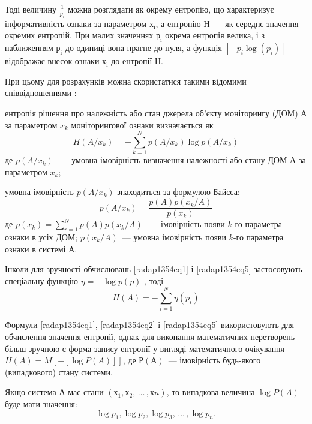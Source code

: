 Тоді величину $\frac{1}{p_i}$  можна розглядати як окрему ентропію, що характеризує інформативність ознаки за параметром $х_і$, а ентропію $Н$~--- як середнє значення окремих ентропій. При малих значеннях $р_і$ окрема ентропія велика, і з наближенням $р_і$ до одиниці вона прагне до нуля, а функція $[-p_i \log (p_i) ]$ відображає внесок ознаки $х_і$ до ентропії $Н$.

При цьому для розрахунків можна скористатися такими відомими співвідношеннями \cite{radap1354ref7}:
\begin{list}{-}{}
	\item ентропія рішення про належність або стан джерела об’єкту моніторингу (ДОМ) $А$ за параметром $x_k$  моніторингової ознаки визначається як
\begin{equation}\label{radap1354eq3}
H(A/x_k)=-\sum \limits_{k=1}^N p(A/x_k) \log p(A/x_k)  
\end{equation}
	де $p(A/x_k)$ ~--- умовна імовірність визначення належності або стану ДОМ $А$ за параметром $x_k$;
	
	\item умовна імовірність $p(A/x_k)$  знаходиться за формулою Байєса:
\begin{equation}\label{radap1354eq4}
p(A/x_k) = \frac{p(A)p(x_k/A)}{p(x_k)}
\end{equation}
	де $p(x_k) = \sum_{r=1}^{N} p(A)p(x_k/A)$ ~--- імовірність появи $k$-го параметра ознаки в усіх ДОМ;  $p(x_k/A)$~--- умовна імовірність появи  $k$-го параметра ознаки в системі $А$.
\end{list}

Інколи для зручності обчислювань \eqref{radap1354eq1} і \eqref{radap1354eq5} застосовують спеціальну функцію $\eta = - \log p(p)$ , тоді 
\begin{equation}\label{radap1354eq5}
H(A) = -\sum\limits_{i=1}^N \eta (p_i)
\end{equation}

Формули  \eqref{radap1354eq1},  \eqref{radap1354eq2} і \eqref{radap1354eq5} використовують для обчислення значення ентропії, однак для виконання математичних перетворень більш зручною є форма запису ентропії у вигляді математичного очікування $H(A)=M[-[\log P(A)]]$, де $Р(А)$~--- імовірність будь-якого (випадкового) стану системи.

Якщо система $А$ має стани $(х_1, х_2, \,\ldots\,, хn)$, то випадкова величина $\log P(A)$ буде мати значення:
\begin{equation}\label{radap1354eq6}
\log p_1, \log p_2, \log p_3, \,\ldots\, , \log p_n.
\end{equation}

